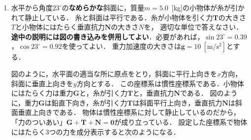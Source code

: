 \documentclass[a4paper,11pt]{ltjsarticle}
\begin{document}
\begin{enumerate}[label={\LARGE \Roman*}]
\begin{enumerate}[label=(\arabic*)]
        \begin{equation}
          \renewcommand{\arraystretch}{3}
            \begin{array}{ccc}
                & y(T)=0 \quad \Leftrightarrow \quad -\dfrac{1}{2}gT^2+h=0 \\
                \Leftrightarrow \quad & T=\sqrt{\dfrac{2h}{g}} = \sqrt{\dfrac{2 \times 125\ [\mathrm{m}]}{10\ [\mathrm{m/s^2}]}}=5.0\ [\mathrm{m}]
            \end{array}
        \end{equation}

        衝突する地点は，時刻$T$でのボールの位置，すなわち，与えられた座標系で$(x(T),0)$である．
        \begin{equation}
            x(T)=v_0T=3.0\ [\mathrm{m/s}] \times 5.0\ [\mathrm{s}]=15\ [\mathrm{m}]
        \end{equation}
        より，ビルの根本から真東に15\ [m]の地点である．
        \vspace{5pt}
    \end{enumerate}

\clearpage

    \item 水平から角度$23^\circ$の\textbf{なめらかな}斜面に，質量$m=5.0$\ [kg]の小物体が糸が引かれて静止している．
    糸と斜面は平行である．糸が小物体を引く力$\bm{T}$の大きさ$T$と小物体にはたらく垂直抗力$\bm{N}$の大きさ$N$を，
    適切な単位で答えなさい．\textbf{途中の説明には図の書き込みを併用してよい}．必要があれば，$\sin 23^\circ = 0.39$，$\cos 23^\circ = 0.92$を使ってよい．
    重力加速度の大きさは$\bm{g}=10\ [\mathrm{m/s^2}]$とする．


    \begin{center}
    \end{center}


    図のように，水平面の適当な所に原点をとり，斜面に平行上向きを$x$方向，斜面に垂直上向きを$y$方向とする．
    この座標系は慣性座標系である．小物体にはたらく力は重力$\bm{G}$と，糸が引く力$\bm{T}$と，垂直抗力$\bm{N}$である．
    図のように，重力$\bm{G}$は鉛直下向き，糸が引く力$\bm{T}$は斜面平行上向き，垂直抗力$\bm{N}$は斜面垂直上向きである．
    物体は慣性座標系に対して静止しているのだから，「力のついあい」$\bm{G}+\bm{T}+\bm{N}=\bm{0}$が成り立っている．
    設定した座標系で物体にはたらく3つの力を成分表示すると次のようになる．


\end{enumerate}
\end{document}
